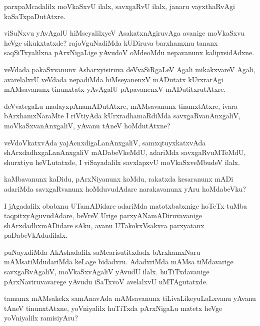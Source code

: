 \documentclass{article}
\begin{document}
\begin{mn}
parxpaMcadalilx moVkaSxvU ilalx, savxgaRvU ilalx, janaru vayxthaRvAgi kaSaTxpaDutAtxre.
\end{mn}

\begin{mn}
viSuNxvu yAvAgalU hiMseyalilxyeV AsakatxnAgiruvAga avanige moVkaSxvu
heVge sikukxtatxde? rajoVguNadiMda kUDiruva barxhamxnu tananx
saqSiTxyalilxna pArxNigaLige yAvudoV oMdeoMdu nepavanunx kalipxsidAdxne.
\end{mn}

\begin{mn}
veVdada pakaSxvanunx Asharxyisiruva deVvaSiRgaLeV Agali mikakxvareV
Agali, avarelalxrU veVdada nepadiMda hiMseyanenxV mADutatx kUrxrarAgi
mAMsavanunx tinunxtatx yAvAgalU pApavanenxV mADutitxrutAtxre.
\end{mn}

\begin{mn}
deVvategaLu madayxpAnamADutAtxre, mAMsavanunx tinunxtAtxre, ivara
bArxhamxNaraMte I riVtiyAda kUrxradhamaRdiMda savxgaRvanAnxgaliV,
moVkaSxvanAnxgaliV, yAvanu tAneV hoMdutAtxne?
\end{mn}

\begin{mn}
veVdoVkatxvAda yajAcnxdigaLanAnxgaliV, samxqtuyxkatxvAda
shArxdadhxgaLanAnxgaliV mADabeVkeMdU, adariMda savxgaRvuMTeMdU,
shurxtiyu heVLutatxde, I viSayadalilx savxlapxvU moVkaSxveMbudeV ilalx.
\end{mn}

\begin{mn}
kaMbavanunx kaDidu, pArxNiyanunx koMdu, rakatxda kesaranunx mADi
adariMda savxgaRvanunx hoMduvudAdare narakavanunx yAru hoMdabeVku?
\end{mn}

\begin{mn}
I jAgadalilx obabxnu UTamADidare adariMda matotxbabxnige hoTeTx tuMba
taqpitxyAguvudAdare, beVreV Urige parxyANamADiruvavanige
shArxdadhxmADidare sAku, avanu UTakokxVsakxra parxyatanx paDabeVkAdudilalx.
\end{mn}

\begin{mn}%
puNayxdiMda AkAshadalilx saMcarisutitxdadx bArxhamxNaru
mAMsatiMdudariMda keLage bidadxru. AdadxriMda mAMsa tiMdavarige
savxgaRvAgaliV, moVkaSxvAgaliV yAvudU ilalx. huTiTxdavanige
pArxNaviruvavarege yAvudu iSaTxvoV avelalxvU uMTAgutatxde.
\end{mn}

\begin{mn}%
tamamx mAMsakekx samAnavAda mAMsavanunx tiLivaLikeyuLaLxvanu yAvanu
tAneV tinunxtAtxne, yoVniyalilx huTiTxda pArxNigaLu matetx heVge
yoVniyalilx ramisiyAru?
\end{mn}
\end{document}

